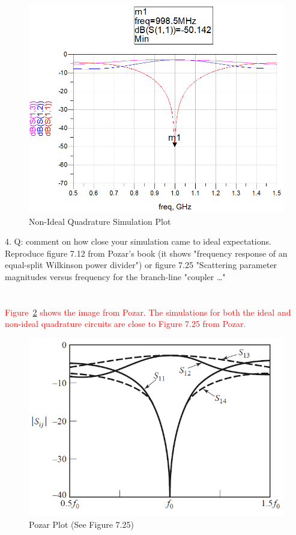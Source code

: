 \documentclass[conference]{IEEEtran}
\begin{document}
\begin{figure}[!h]
\centering
\includegraphics[scale=0.35]{quadrature-nonideal-plot.png}
\caption{Non-Ideal Quadrature Simulation Plot}
\label{fig:nonideal_plot}
\end{figure}

4. Q: comment on how close your simulation came to ideal expectations. Reproduce figure 7.12 from Pozar’s book (it shows "frequency response of an equal-split Wilkinson power divider") or figure 7.25 "Scattering parameter magnitudes versus frequency for the branch-line "coupler …"\\\\\\
\textcolor{red}{Figure~\ref{fig:pozar_plot} shows the image from Pozar.  The simulations for both the ideal and non-ideal quadrature circuits are close to Figure 7.25 from Pozar.}\\
\begin{figure}[!h]
\centering
\includegraphics[scale=0.35]{pozar_plot.png}
\caption{Pozar Plot (See Figure 7.25)}
\label{fig:pozar_plot}
\end{figure}
\end{document}
